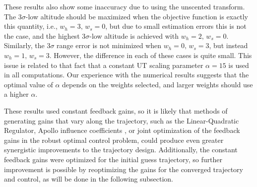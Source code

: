 These results also show some inaccuracy due to using the unscented transform. The 3$\sigma$-low altitude should be maximized when the objective function is exactly this quantity, i.e., $w_h=3,\,w_s=0$, but due to small estimation errors this is not the case, and the highest 3$\sigma$-low altitude is achieved with $w_h=2,\,w_s=0$. Similarly, the 3$\sigma$ range error is not minimized when $w_h=0,\,w_s=3$, but instead $w_h=1,\,w_s=3$. However, the difference in each of these cases is quite small. This issue is related to that fact that a constant UT scaling parameter $\alpha=15$ is used in all computations. Our experience with the numerical results suggests that the optimal value of $\alpha$ depends on the weights selected, and larger weights should use a higher $\alpha$. 

These results used constant feedback gains, so it is likely that methods of generating gains that vary along the trajectory, such as the Linear-Quadratic Regulator, Apollo influence coefficients \cite{Apollo}, or joint optimization of the feedback gains in the robust optimal control problem, could produce even greater synergistic improvements to the trajectory design. Additionally, the constant feedback gains were optimized for the initial guess trajectory, so further improvement is possible by reoptimizing the gains for the converged trajectory and control, as will be done in the following subsection.

